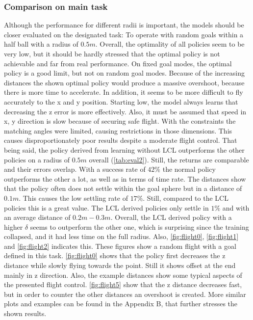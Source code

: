 \subsubsection{Comparison on main task}
Although the performance for different radii is important, the models should be closer evaluated 
on the designated task: To operate with random goals within a half ball with a radius of $0.5m$.
Overall, the optimality of all policies seem to be very low, but it should be hardly stressed 
that the optimal policy is not achievable and far from real performance.
On fixed goal modes, the optimal policy is a good limit, but not on random goal modes.
Because of the increasing distances the shown optimal policy would produce a massive overshoot, 
because there is more time to accelerate.
In addition, it seems to be more difficult to fly accurately to the x and y position.
Starting low, the model always learns that decreasing the z error is more effectively.
Also, it must be assumed that speed in x, y direction is slow because of securing safe flight.
With the constraints the matching angles were limited, causing restrictions in those dimensions.
This causes disproportionately poor results despite a moderate flight control.
That being said, the policy derived from learning without LCL outperforms the other 
policies on a radius of $0.5m$ overall (\cref{tab:eval2}). Still, the returns are comparable 
and their errors overlap. With a success rate of $42 \%$ the normal policy outperforms the other 
a lot, as well as in terms of time rate. 
The distances show that the policy often does not settle within the goal sphere but in a distance of
$0.1m$. This causes the low settling rate of $17 \%$. Still, compared to the 
LCL policies this is a great value. The LCL derived policies only settle 
in $1\%$ and with an average distance of $0.2m-0.3m$.
Overall, the LCL derived policy with a higher $\delta$ seems to outperform the other one, 
which is surprising since the training collapsed, and it had less time on the full radius.
Also, \cref{fig:flight0}, \cref{fig:flight1} and \cref{fig:flight2} indicates this.
These figures show a random flight with a goal defined in this task.
\cref{fig:flight0} shows that the policy first decreases the z distance while slowly flying towards 
the point.
Still it shows offset at the end mainly in z direction.
Also, the example distances show some typical aspects of the presented flight control.
\cref{fig:flight5} show that the z distance decreases fast, but in order to counter the 
other distances an overshoot is created. More similar plots and examples can be found 
in the Appendix B, that further stresses the shown results.

